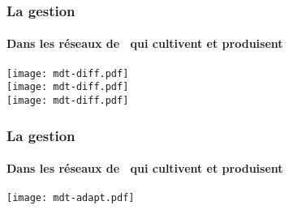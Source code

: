 \begin{frame}
\frametitle{La gestion \insitu}
\framesubtitle{Dans les réseaux de \MSPs~qui cultivent et produisent}

\begin{overprint}
\centering\texttt{[image: mdt-diff.pdf]}\\
\centering\texttt{[image: mdt-diff.pdf]}\\
\centering\texttt{[image: mdt-diff.pdf]}\\
\end{overprint}

\end{frame}



\begin{frame}
\frametitle{La gestion \insitu}
\framesubtitle{Dans les réseaux de \MSPs~qui cultivent et produisent}

\begin{overprint}
\centering\texttt{[image: mdt-adapt.pdf]}\\
\end{overprint}

\end{frame}

